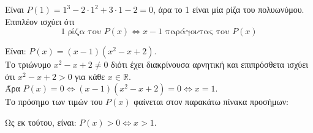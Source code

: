 \begin{alist}
\item Είναι $P(1) = 1^3 - 2 \cdot 1^2 + 3 \cdot 1 - 2 = 0$, άρα το 1 είναι μία ρίζα του πολυωνύμου. \\
Επιπλέον ισχύει ότι
\[1 \text{ ρίζα του } P(x) \Leftrightarrow x - 1 \text{ παράγοντας του } P(x)\]
\item Είναι: $P(x) = (x - 1)(x^2 - x + 2)$. \\
Το τριώνυμο $x^2 - x + 2 \ne 0$ διότι έχει διακρίνουσα αρνητική και επιπρόσθετα ισχύει ότι $x^2 - x + 2 > 0$ για κάθε $x \in \mathbb{R}$. \\
Άρα $P(x) = 0 \Leftrightarrow (x - 1)(x^2 - x + 2) = 0 \Leftrightarrow x = 1$. \\
Το πρόσημο των τιμών του $P(x)$ φαίνεται στον παρακάτω πίνακα προσήμων:
\begin{center}
\end{center}
Ως εκ τούτου, είναι: $P(x) > 0 \Leftrightarrow x > 1$.
\end{alist}

